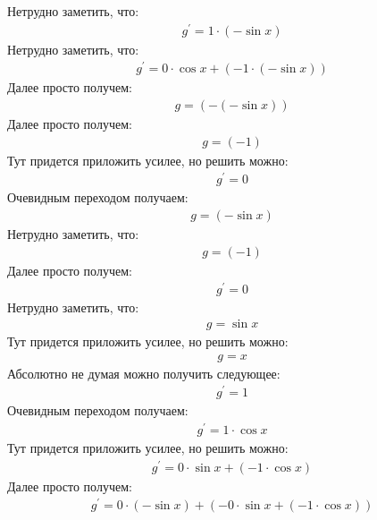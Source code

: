 \documentclass[12pt,a4paper]{scrartcl}
\begin{document}
Нетрудно заметить, что:
\begin{gather}\label{eq:f2a58040}g^\prime  = 1 \cdot  \left(- \sin{ x } \right) \end{gather}
Нетрудно заметить, что:
\begin{gather}\label{eq:f2a578c0}g^\prime  = 0 \cdot  \cos{ x }  +  \left(-1 \cdot  \left(- \sin{ x } \right) \right) \end{gather}
Далее просто получем:
\begin{gather}\label{eq:f2a57d40}g  =  \left(- \left(- \sin{ x } \right) \right) \end{gather}
Далее просто получем:
\begin{gather}\label{eq:f2a57cb0}g  = \left(-1\right)\end{gather}
Тут придется приложить усилее, но решить можно:
\begin{gather}\label{eq:f2a57ef0}g^\prime  = 0\end{gather}
Очевидным переходом получаем:
\begin{gather}\label{eq:f2a58070}g  =  \left(- \sin{ x } \right) \end{gather}
Нетрудно заметить, что:
\begin{gather}\label{eq:f2a57da0}g  = \left(-1\right)\end{gather}
Далее просто получем:
\begin{gather}\label{eq:f2a58220}g^\prime  = 0\end{gather}
Нетрудно заметить, что:
\begin{gather}\label{eq:f2a57d70}g  =  \sin{ x } \end{gather}
Тут придется приложить усилее, но решить можно:
\begin{gather}\label{eq:f2a57ce0}g  = x\end{gather}
Абсолютно не думая можно получить следующее:
\begin{gather}\label{eq:f2a583a0}g^\prime  = 1\end{gather}
Очевидным переходом получаем:
\begin{gather}\label{eq:f2a58370}g^\prime  = 1 \cdot  \cos{ x } \end{gather}
Тут придется приложить усилее, но решить можно:
\begin{gather}\label{eq:f2a581c0}g^\prime  = 0 \cdot  \sin{ x }  +  \left(-1 \cdot  \cos{ x } \right) \end{gather}
Далее просто получем:
\begin{gather}\label{eq:f2a57d10}g^\prime  = 0 \cdot  \left(- \sin{ x } \right)  +  \left(-0 \cdot  \sin{ x }  +  \left(-1 \cdot  \cos{ x } \right) \right) \end{gather}
\end{document}
